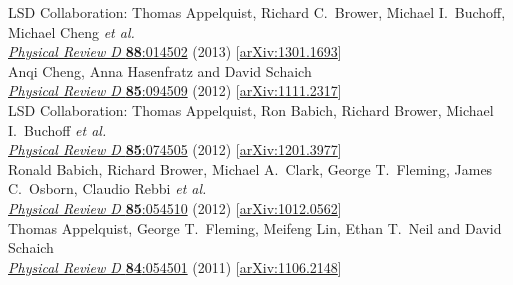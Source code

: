 \begin{spacelist}
\begin{revnumerate}
      LSD Collaboration: Thomas Appelquist, Richard C.~Brower, Michael I.~Buchoff, Michael Cheng \textit{et al.} \\ %
      \href{http://dx.doi.org/10.1103/PhysRevD.88.014502}{\textit{Physical Review D} \textbf{88}:014502} (2013) [\href{http://arxiv.org/abs/1301.1693}{arXiv:1301.1693}]
    \pagebreakitem
       \\
      Anqi Cheng, Anna Hasenfratz and David Schaich \\
      \href{http://dx.doi.org/10.1103/PhysRevD.85.094509}{\textit{Physical Review D} \textbf{85}:094509} (2012) [\href{http://arxiv.org/abs/1111.2317}{arXiv:1111.2317}]
    \pagebreakitem
       \\
      LSD Collaboration: Thomas Appelquist, Ron Babich, Richard Brower, Michael I.~Buchoff \textit{et al.} \\ %
      \href{http://dx.doi.org/10.1103/PhysRevD.85.074505}{\textit{Physical Review D} \textbf{85}:074505} (2012) [\href{http://arxiv.org/abs/1201.3977}{arXiv:1201.3977}]
    \pagebreakitem
       \\
      Ronald Babich, Richard Brower, Michael A.~Clark, George T.~Fleming, James C.~Osborn, Claudio Rebbi \textit{et al.} \\ %
      \href{http://dx.doi.org/10.1103/PhysRevD.85.054510}{\textit{Physical Review D} \textbf{85}:054510} (2012) [\href{http://arxiv.org/abs/1012.0562}{arXiv:1012.0562}]
    \pagebreakitem
       \\
      Thomas Appelquist, George T.~Fleming, Meifeng Lin, Ethan T.~Neil and David Schaich \\
      \href{http://dx.doi.org/10.1103/PhysRevD.84.054501}{\textit{Physical Review D} \textbf{84}:054501} (2011) [\href{http://arxiv.org/abs/1106.2148}{arXiv:1106.2148}]
    \pagebreakitem
       \\

\end{revnumerate}
\end{spacelist}
